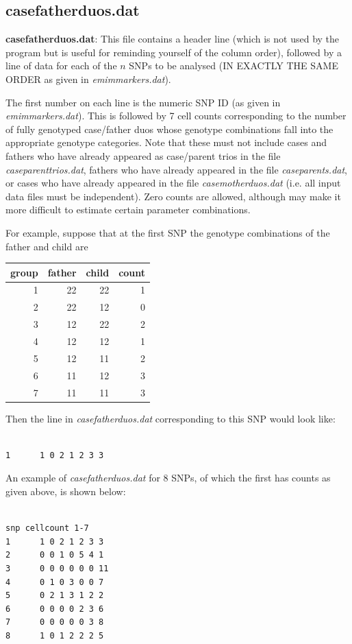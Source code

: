 \documentclass[a4paper,12pt]{article}
\begin{document}
\subsection{casefatherduos.dat}
\label{casefatherduos}

{\bf casefatherduos.dat}: This file contains a header line (which is not used by the program but is useful for reminding yourself of the column order), followed by a line of data for each of the $n$ SNPs to be analysed (IN EXACTLY THE SAME ORDER as given in {\it emimmarkers.dat}). 

The first number on each line is the numeric SNP ID (as given in {\it emimmarkers.dat}). This is followed by 7 cell counts corresponding to the number of fully genotyped case/father duos whose genotype combinations fall into the appropriate genotype categories. Note that these must not include cases and fathers who have already appeared as case/parent trios in the file {\it caseparenttrios.dat}, fathers who have already appeared in the file {\it caseparents.dat}, or cases who have already appeared in the file {\it casemotherduos.dat} (i.e. all input data files must be independent). Zero counts are allowed, although may make it more difficult to estimate certain parameter combinations. 

For example, suppose that at the first SNP the genotype combinations of the father and child are 

{\begin{center}\begin{tabular}{rrrr}
group  & father  & child  & count\\
\hline
1  & 22  & 22  & 1\\
2  & 22  & 12  & 0\\
3  & 12  & 22  & 2\\
4  & 12  & 12  & 1\\
5  & 12  & 11  & 2\\
6  & 11  & 12  & 3\\
7  & 11  & 11  & 3\\
\end{tabular}\end{center}}

Then the line in {\it casefatherduos.dat} corresponding to this SNP would look like: 
\vspace{0.35cm} \begin{lstlisting}

1      1 0 2 1 2 3 3

\end{lstlisting} \vspace{0.35cm}
An example of {\it casefatherduos.dat} for 8 SNPs, of which the first has counts as given above, is shown below: 
\vspace{0.35cm} \begin{lstlisting}

snp cellcount 1-7
1      1 0 2 1 2 3 3
2      0 0 1 0 5 4 1
3      0 0 0 0 0 0 11
4      0 1 0 3 0 0 7
5      0 2 1 3 1 2 2
6      0 0 0 0 2 3 6
7      0 0 0 0 0 3 8
8      1 0 1 2 2 2 5

\end{lstlisting} \vspace{0.35cm}
\end{document}
